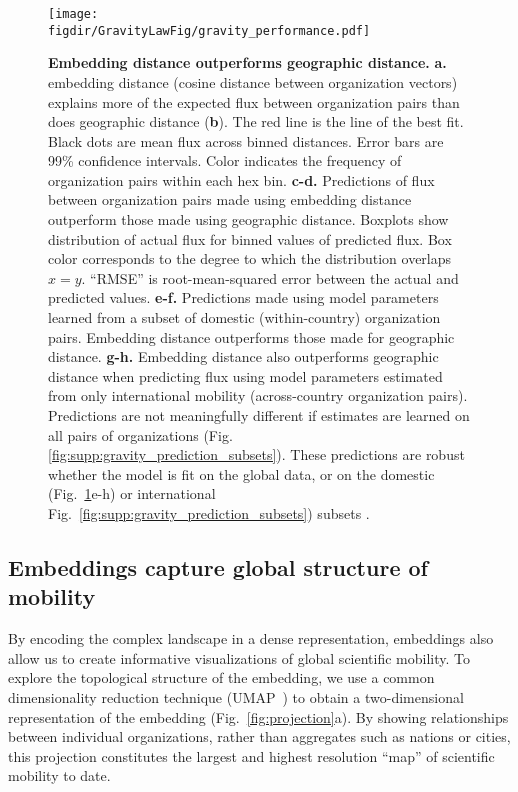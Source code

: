 \documentclass[12pt]{article} %
\def\figdir{../Figs}
\begin{document}
%
%
\begin{figure}[h!]
	\centering
	\texttt{[image: \\figdir/GravityLawFig/gravity\_performance.pdf]}
	\caption{
		\textbf{Embedding distance outperforms geographic distance.}
		\textbf{a.} embedding distance (cosine distance between organization vectors) explains more of the expected flux between organization pairs than does geographic distance (\textbf{b}).
		The red line is the line of the best fit.
		Black dots are mean flux across binned distances.
		Error bars are 99\% confidence intervals.
		Color indicates the frequency of organization pairs within each hex bin.
		\textbf{c-d.} Predictions of flux between organization pairs made using embedding distance outperform those made using geographic distance.
		Boxplots show distribution of actual flux for binned values of predicted flux.
		Box color corresponds to the degree to which the distribution overlaps $x = y$.
		``RMSE'' is root-mean-squared error between the actual and predicted values.
		\textbf{e-f.} Predictions made using model parameters learned from a subset of domestic (within-country) organization pairs.
		Embedding distance outperforms those made for geographic distance.
		\textbf{g-h.} Embedding distance also outperforms geographic distance when predicting flux using model parameters estimated from only international mobility (across-country organization pairs).
		Predictions are not meaningfully different if estimates are learned on all pairs of organizations (Fig. \ref{fig:supp:gravity_prediction_subsets}).
		These predictions are robust whether the model is fit on the global data, or on the domestic (Fig.~\ref{fig:gravity_performance}e-h) or international Fig.~\ref{fig:supp:gravity_prediction_subsets}) subsets .
	}
	\label{fig:gravity_performance}
\end{figure}


\subsection*{Embeddings capture global structure of mobility}

By encoding the complex landscape in a dense representation, embeddings also allow us to create informative visualizations of global scientific mobility.
To explore the topological structure of the embedding, we use a common dimensionality reduction technique (UMAP~\autocite{mcinnes2018umap}) to obtain a two-dimensional representation of the embedding (Fig.~\ref{fig:projection}a).
By showing relationships between individual organizations, rather than aggregates such as nations or cities, this projection constitutes the largest and highest resolution ``map'' of scientific mobility to date.
\end{document}
